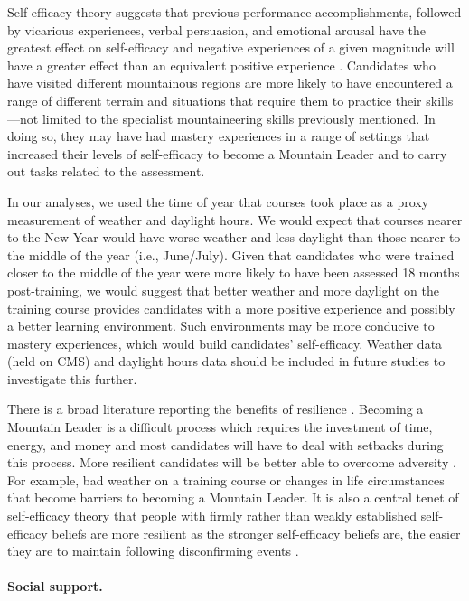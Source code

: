 \documentclass[
  12pt,
  a4paper,
]{book}
\begin{document}
Self-efficacy theory suggests that previous performance accomplishments, followed by vicarious experiences, verbal persuasion, and emotional arousal have the greatest effect on self-efficacy and negative experiences of a given magnitude will have a greater effect than an equivalent positive experience \citep{Bandura1977, Bandura1982}. Candidates who have visited different mountainous regions are more likely to have encountered a range of different terrain and situations that require them to practice their skills---not limited to the specialist mountaineering skills previously mentioned. In doing so, they may have had mastery experiences in a range of settings that increased their levels of self-efficacy to become a Mountain Leader and to carry out tasks related to the assessment.

In our analyses, we used the time of year that courses took place as a proxy measurement of weather and daylight hours. We would expect that courses nearer to the New Year would have worse weather and less daylight than those nearer to the middle of the year (i.e., June/July). Given that candidates who were trained closer to the middle of the year were more likely to have been assessed 18 months post-training, we would suggest that better weather and more daylight on the training course provides candidates with a more positive experience and possibly a better learning environment. Such environments may be more conducive to mastery experiences, which would build candidates' self-efficacy. Weather data (held on CMS) and daylight hours data should be included in future studies to investigate this further.

There is a broad literature reporting the benefits of resilience \citep[e.g.,][]{Seery2016, Smith2008}. Becoming a Mountain Leader is a difficult process which requires the investment of time, energy, and money and most candidates will have to deal with setbacks during this process. More resilient candidates will be better able to overcome adversity \citep{Smith2008}. For example, bad weather on a training course or changes in life circumstances that become barriers to becoming a Mountain Leader. It is also a central tenet of self-efficacy theory that people with firmly rather than weakly established self-efficacy beliefs are more resilient as the stronger self-efficacy beliefs are, the easier they are to maintain following disconfirming events \citep{Bandura1997}.

\hypertarget{pra-male-gta-social-support}{%
\paragraph{Social support.}\label{pra-male-gta-social-support}}
\end{document}
